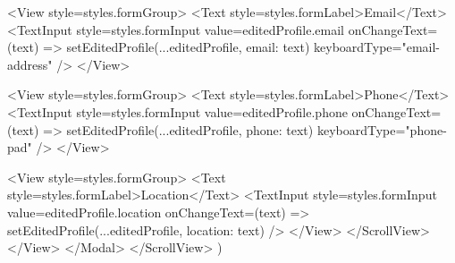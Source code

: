 {            <View style={styles.formGroup}>
              <Text style={styles.formLabel}>Email</Text>
              <TextInput
                style={styles.formInput}
                value={editedProfile.email}
                onChangeText={(text) => setEditedProfile({...editedProfile, email: text})}
                keyboardType="email-address"
              />
            </View>
            
            <View style={styles.formGroup}>
              <Text style={styles.formLabel}>Phone</Text>
              <TextInput
                style={styles.formInput}
                value={editedProfile.phone}
                onChangeText={(text) => setEditedProfile({...editedProfile, phone: text})}
                keyboardType="phone-pad"
              />
            </View>
            
            <View style={styles.formGroup}>
              <Text style={styles.formLabel}>Location</Text>
              <TextInput
                style={styles.formInput}
                value={editedProfile.location}
                onChangeText={(text) => setEditedProfile({...editedProfile, location: text})}
              />
            </View>
          </ScrollView>
        </View>
      </Modal>
    </ScrollView>
  )
}

